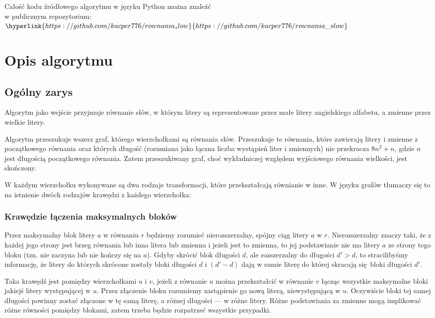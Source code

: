 \documentclass[leqno, 12pt]{article}
\begin{document}
Całość kodu źródłowego algorytmu w języku Python można znaleźć \\ w publicznym repozytorium: \\ $\hyperlink{https://github.com/kacper776/rownania_slow}{https://github.com/kacper776/rownania\_slow}$

\newpage
\section{Opis algorytmu}

\subsection{Ogólny zarys}
Algorytm jako wejście przyjmuje równanie słów, w którym litery są reprezentowane przez małe litery angielskiego alfabetu, a zmienne przez wielkie litery.


Algorytm przeszukuje wszerz graf, którego wierzchołkami są równania słów. 
Przeszukuje te równania, które zawierają litery i zmienne z początkowego równania oraz których długość (rozumiana jako łączna liczba wystąpień liter i zmiennych) nie przekracza $8n^2 + n$, gdzie $n$ jest długością początkowego równania. Zatem przeszukiwany graf, choć wykładniczej względem wyjściowego równania wielkości, jest skończony.

W każdym wierzchołku wykonywane są dwa rodzaje transformacji, które przekształcają równianie w inne. W języku grafów tłumaczy się to na istnienie dwóch rodzajów krawędzi z każdego wierzchołka:

\subsubsection*{Krawędzie łączenia maksymalnych bloków}
Przez maksymalny blok litery $a$ w równaniu $r$ będziemy rozumieć nierozszerzalny, spójny ciąg litery $a$ w $r$. Nierozszerzalny znaczy taki, że z każdej jego strony jest brzeg równania lub inna litera lub zmienna i jeżeli jest to zmienna, to jej podstawianie nie ma litery $a$ ze strony tego bloku (tzn. nie zaczyna lub nie kończy się na $a$). Gdyby skrócić blok długości $d$, ale rozszerzalny do długości $d' > d$, to stracilibyśmy informację, że litery do których skrócone zostały bloki długości $d$ i $(d' - d)$ dają w sumie literę do której skracają się bloki długości $d'$.

Taka krawędź jest pomiędzy wierzchołkami $u$ i $v$, jeżeli z równanie $u$ można przekształcić w równanie $v$ łącząc wszystkie maksymalne bloki jakiejś litery występującej w $u$. Przez złączenie bloku rozumiemy zastąpienie go nową literą, niewystępującą w $u$. Oczywiście bloki tej samej długości powinny zostać złączone w tę samą literę, a różnej długości --- w różne litery.
Różne podstawiania za zmienne mogą implikować różne równości pomiędzy blokami, zatem trzeba będzie rozpatrzeć wszystkie przypadki.
\end{document}
